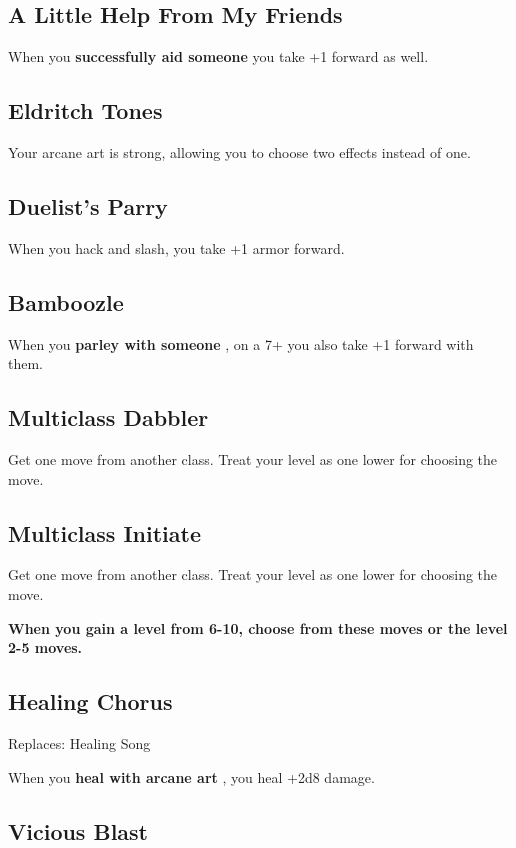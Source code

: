 \subsection{A Little Help From My Friends}

When you \textbf{successfully aid someone}
you take +1 forward as well.
\subsection{Eldritch Tones}

Your arcane art is strong, allowing you to choose two effects instead of one.
\subsection{Duelist's Parry}

When you hack and slash, you take +1 armor forward.
\subsection{Bamboozle}

When you \textbf{parley with someone}
, on a 7+ you also take +1 forward with them.
\subsection{Multiclass Dabbler}

Get one move from another class. Treat your level as one lower for choosing the move.
\subsection{Multiclass Initiate}

Get one move from another class. Treat your level as one lower for choosing the move.

\vspace{\baselineskip}
{\bfseries When you gain a level from 6-10, choose from these moves or the level 2-5 moves.}
\subsection{Healing Chorus}

Replaces: Healing Song

When you \textbf{heal with arcane art}
, you heal +2d8 damage.
\subsection{Vicious Blast}

